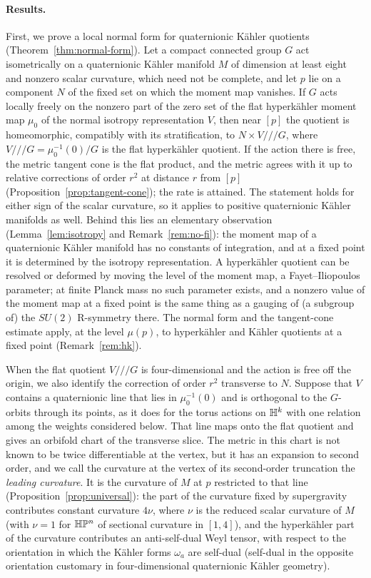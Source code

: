 \paragraph{Results.}
First, we prove a local normal form for quaternionic K\"ahler quotients
(Theorem~\ref{thm:normal-form}). Let a compact connected group $G$ act isometrically on a
quaternionic K\"ahler manifold $M$ of dimension at least eight and nonzero scalar curvature, which
need not be complete, and
let $p$ lie on a component $N$ of the fixed set on which the moment map vanishes. If $G$ acts
locally freely on the nonzero part of the zero set of the flat hyperk\"ahler moment map $\mu_0$ of
the normal isotropy representation $V$, then near $[p]$ the quotient is homeomorphic, compatibly
with its stratification, to $N\times V/\!/\!/G$, where $V/\!/\!/G=\mu_0^{-1}(0)/G$ is the flat
hyperk\"ahler quotient. If the action there is free, the metric
tangent cone is the flat product, and the metric agrees with it up to relative corrections of
order $r^2$ at distance $r$ from $[p]$ (Proposition~\ref{prop:tangent-cone}); the rate is
attained. The statement holds for either sign of the scalar curvature, so it applies to positive
quaternionic K\"ahler manifolds as well. Behind this lies an
elementary observation (Lemma~\ref{lem:isotropy} and Remark~\ref{rem:no-fi}): the moment map of
a quaternionic K\"ahler manifold has no constants of integration, and at a fixed point it is
determined by the isotropy representation. A hyperk\"ahler quotient can be resolved or deformed
by moving the level of the moment map, a Fayet--Iliopoulos parameter; at finite Planck mass no
such parameter exists, and a nonzero value of the moment map at a fixed point is the same thing
as a gauging of (a subgroup of) the $SU(2)$ R-symmetry there. The normal form and the
tangent-cone estimate apply, at the level $\mu(p)$, to hyperk\"ahler and K\"ahler quotients at a fixed point
(Remark~\ref{rem:hk}). 

When the flat quotient $V/\!/\!/G$ is four-dimensional and the action is free off the origin, we also identify the correction of order
$r^2$ transverse to $N$. Suppose that $V$ contains a quaternionic line that lies in $\mu_0^{-1}(0)$ and
is orthogonal to the $G$-orbits through its points, as it does for the torus actions on $\mathbb H^k$ with
one relation among the weights considered below. That line maps onto the flat quotient and gives
an orbifold chart of the transverse slice. The metric in this chart is not known to be twice
differentiable at the vertex, but it has an expansion to second order, and we call the curvature at the
vertex of its second-order truncation the \emph{leading curvature}. It is the curvature of $M$ at $p$ restricted to that
line (Proposition~\ref{prop:universal}): the part of the curvature fixed by supergravity
contributes constant curvature $4\nu$, where $\nu$ is the reduced scalar curvature of $M$ (with $\nu=1$ for
$\mathbb H\mathbb P^n$ of sectional curvature in $[1,4]$), and the hyperk\"ahler part of the curvature contributes an
anti-self-dual Weyl tensor, with respect to the orientation in which the K\"ahler forms $\omega_a$ are
self-dual (self-dual in the opposite orientation customary in four-dimensional quaternionic K\"ahler
geometry).

